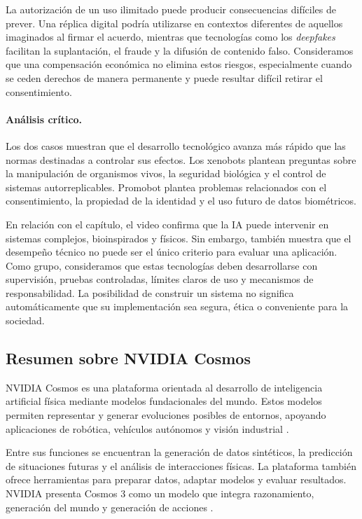 \documentclass[14pt,twoside]{article}
\begin{document}
La autorización de un uso ilimitado puede producir consecuencias difíciles de prever. Una réplica digital podría utilizarse en contextos diferentes de aquellos imaginados al firmar el acuerdo, mientras que tecnologías como los \textit{deepfakes} facilitan la suplantación, el fraude y la difusión de contenido falso. Consideramos que una compensación económica no elimina estos riesgos, especialmente cuando se ceden derechos de manera permanente y puede resultar difícil retirar el consentimiento.

\paragraph{Análisis crítico.}

Los dos casos muestran que el desarrollo tecnológico avanza más rápido que las normas destinadas a controlar sus efectos. Los xenobots plantean preguntas sobre la manipulación de organismos vivos, la seguridad biológica y el control de sistemas autorreplicables. Promobot plantea problemas relacionados con el consentimiento, la propiedad de la identidad y el uso futuro de datos biométricos.

En relación con el capítulo, el video confirma que la IA puede intervenir en sistemas complejos, bioinspirados y físicos. Sin embargo, también muestra que el desempeño técnico no puede ser el único criterio para evaluar una aplicación. Como grupo, consideramos que estas tecnologías deben desarrollarse con supervisión, pruebas controladas, límites claros de uso y mecanismos de responsabilidad. La posibilidad de construir un sistema no significa automáticamente que su implementación sea segura, ética o conveniente para la sociedad.


\subsection{Resumen sobre NVIDIA Cosmos}

NVIDIA Cosmos es una plataforma orientada al desarrollo de
inteligencia artificial física mediante modelos fundacionales
del mundo. Estos modelos permiten representar y generar
evoluciones posibles de entornos, apoyando aplicaciones de
robótica, vehículos autónomos y visión industrial
\cite{nvidiaCosmos}.

Entre sus funciones se encuentran la generación de datos
sintéticos, la predicción de situaciones futuras y el análisis
de interacciones físicas. La plataforma también ofrece
herramientas para preparar datos, adaptar modelos y evaluar
resultados. NVIDIA presenta Cosmos 3 como un modelo que integra
razonamiento, generación del mundo y generación de acciones
\cite{nvidiaCosmos}.
\end{document}
